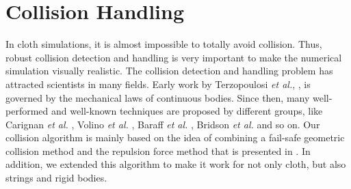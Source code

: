 \section{Collision Handling}
\label{Sec:CH}
In cloth simulations, it is almost impossible to totally avoid collision. 
Thus, robust collision detection and handling is very important to make the 
numerical simulation visually realistic. 
The collision detection and handling problem has attracted scientists in 
many fields. 
Early work by Terzopoulosi \emph{et al.}, \cite{terzopoulos1987elastically, 
terzopoulos1988modeling, terzopoulos1991deformable}, is governed 
by the mechanical laws of continuous bodies. 
Since then, many well-performed and well-known techniques are proposed by 
different groups, like Carignan \emph{et al.} \cite{carignan1992dressing}, 
Volino \emph{et al.} \cite{volino1995collision, volino1995versatile, 	volino1996evolving}, Baraff \emph{et al.} \cite{baraff1998large, 
baraff2003untangling}, Bridson \emph{et al.} \cite{Bridson2002collsn} and 
so on.  
Our collision algorithm is mainly based on the idea of combining a fail-safe 
geometric collision method and the repulsion force method that is presented 
in \cite{Bridson2002collsn}. 
In addition, we extended this algorithm to make it work for not only cloth, 
but also strings and rigid bodies.

